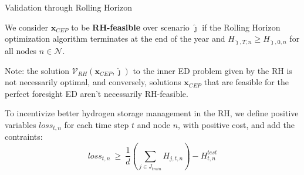 \documentclass[pdf]{beamer}
\newcommand{\cN}{\mathcal{N}}
\begin{document}
  \begin{frame}{Validation through Rolling Horizon}
    
    \begin{definition}
      We consider $\mathbf{x}_{CEP}$ to be \textbf{RH-feasible} over scenario $\hat{\jmath}$ if the Rolling Horizon optimization algorithm terminates at the end of the year and $H_{\hat{\jmath},T,n}\ge H_{\hat{\jmath},0,n}$ for all nodes $n\in\cN$.
      \end{definition}
      \small
    Note: the solution $\mathcal{V}_{RH}(\mathbf{x}_{CEP},\hat{\jmath})$ to the inner ED problem given by the RH is not necessarily optimal, and conversely, solutions $\mathbf{x}_{CEP}$ that are feasible for the perfect foresight ED aren't necessarily RH-feasible.\vspace{1em}
    

    To incentivize better hydrogen storage management in the RH, we define positive variables $loss_{t,n}$ for each time step $t$ and node $n$, with positive cost, and add the contraints:
\begin{equation}
loss_{t,n}\ \ge\ \frac{1}{d}\left(\sum_{j\in J_{train}}H_{j,t,n}\right) - H^{test}_{t,n} 
\end{equation}
  \end{frame}
\end{document}
